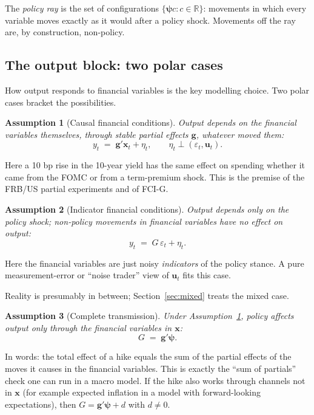 \documentclass[11pt]{article}
\newtheorem{assumption}{Assumption}
\theoremstyle{definition}
\theoremstyle{remark}
\newcommand{\bpsi}{\boldsymbol{\psi}}
\newcommand{\bx}{\mathbf{x}}
\newcommand{\bu}{\mathbf{u}}
\newcommand{\bg}{\mathbf{g}}
\begin{document}
The \emph{policy ray} is the set of configurations $\{\bpsi c : c\in\mathbb{R}\}$: movements in which every variable moves exactly as it would after a policy shock. Movements off the ray are, by construction, non-policy.

\subsection{The output block: two polar cases}

How output responds to financial variables is the key modelling choice. Two polar cases bracket the possibilities.

\begin{assumption}[Causal financial conditions]\label{ass:C}
Output depends on the financial variables themselves, through stable partial effects $\bg$, whatever moved them:
\begin{equation}\label{eq:C}
y_t \;=\; \bg'\bx_t + \eta_t ,\qquad \eta_t \perp (\varepsilon_t,\bu_t).
\end{equation}
\end{assumption}
\noindent Here a 10 bp rise in the 10-year yield has the same effect on spending whether it came from the FOMC or from a term-premium shock. This is the premise of the FRB/US partial experiments and of FCI-G.

\begin{assumption}[Indicator financial conditions]\label{ass:N}
Output depends only on the policy shock; non-policy movements in financial variables have no effect on output:
\begin{equation}\label{eq:N}
y_t \;=\; G\,\varepsilon_t + \eta_t .
\end{equation}
\end{assumption}
\noindent Here the financial variables are just noisy \emph{indicators} of the policy stance. A pure measurement-error or ``noise trader'' view of $\bu_t$ fits this case.

Reality is presumably in between; Section~\ref{sec:mixed} treats the mixed case.

\begin{assumption}[Complete transmission]\label{ass:A1}
Under Assumption~\ref{ass:C}, policy affects output only through the financial variables in $\bx$:
\begin{equation}\label{eq:A1}
G \;=\; \bg'\bpsi .
\end{equation}
\end{assumption}
\noindent In words: the total effect of a hike equals the sum of the partial effects of the moves it causes in the financial variables. This is exactly the ``sum of partials'' check one can run in a macro model. If the hike also works through channels not in $\bx$ (for example expected inflation in a model with forward-looking expectations), then $G = \bg'\bpsi + d$ with $d\neq 0$.
\end{document}
